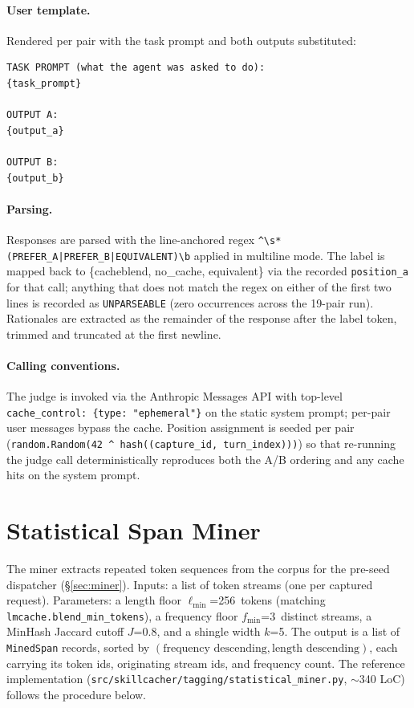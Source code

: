\paragraph{User template.} Rendered per pair with the task prompt
and both outputs substituted:
\begin{lstlisting}[basicstyle=\ttfamily\footnotesize, frame=single,
                   framesep=4pt, breaklines=true]
TASK PROMPT (what the agent was asked to do):
{task_prompt}

OUTPUT A:
{output_a}

OUTPUT B:
{output_b}
\end{lstlisting}

\paragraph{Parsing.} Responses are parsed with the line-anchored
regex \texttt{\^{}\textbackslash{}s*(PREFER\_A|PREFER\_B|EQUIVALENT)\textbackslash{}b}
applied in multiline mode. The label is mapped back to
\{cacheblend, no\_cache, equivalent\} via the recorded
\texttt{position\_a} for that call; anything that does not match the
regex on either of the first two lines is recorded as
\texttt{UNPARSEABLE} (zero occurrences across the 19-pair run).
Rationales are extracted as the remainder of the response after the
label token, trimmed and truncated at the first newline.

\paragraph{Calling conventions.} The judge is invoked via the
Anthropic Messages API with top-level \texttt{cache\_control:
\{type: "ephemeral"\}} on the static system prompt; per-pair user
messages bypass the cache. Position assignment is seeded
per pair (\texttt{random.Random(42 \^{} hash((capture\_id,
turn\_index)))}) so that re-running the judge call deterministically
reproduces both the A/B ordering and any cache hits on the system
prompt.

\section{Statistical Span Miner}
\label{app:miner}

The miner extracts repeated token sequences from the
\dataset{} corpus for the pre-seed dispatcher
(\S\ref{sec:miner}). Inputs: a list of token streams (one per
captured request). Parameters: a length floor
$\ell_{\min}$=256~tokens (matching
\texttt{lmcache.blend\_min\_tokens}), a frequency floor
$f_{\min}$=3~distinct streams, a MinHash Jaccard cutoff $J$=0.8,
and a shingle width $k$=5. The output is a list of
\texttt{MinedSpan} records, sorted by
$(\text{frequency descending}, \text{length descending})$, each
carrying its token ids, originating stream ids, and frequency
count. The reference implementation
(\texttt{src/\allowbreak{}skillcacher/\allowbreak{}tagging/\allowbreak{}statistical\_\allowbreak{}miner.py},
$\sim$340 LoC) follows the procedure below.

